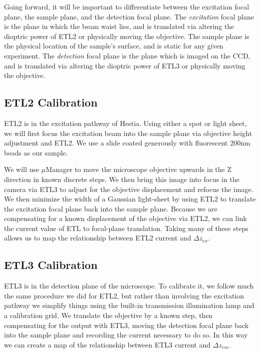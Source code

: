 Going forward, it will be important to differentiate between the excitation focal plane, the sample plane, and the detection focal plane. The \textit{excitation} focal plane is the plane in which the beam waist lies, and is translated via altering the dioptric power of ETL2 or physically moving the objective. The sample plane is the physical location of the sample's surface, and is static for any given experiment. The \textit{detection} focal plane is the plane which is imaged on the CCD, and is translated via altering the dioptric power of ETL3 or physically moving the objective.

\subsection{ETL2 Calibration}
\par ETL2 is in the excitation pathway of Hestia. Using either a spot or light sheet, we will first focus the excitation beam into the sample plane via objective height adjustment and ETL2. We use a slide coated generously with fluorescent 200nm beads as our sample.
\par We will use $\mu$Manager to move the microscope objective upwards in the Z direction in known discrete steps. We then bring this image into focus in the camera via ETL3 to adjust for the objective displacement and refocus the image. We then minimize the width of a Gaussian light-sheet by using ETL2 to translate the excitation focal plane back into the sample plane. Because we are compensating for a known displacement of the objective via ETL2, we can link the current value of ETL to focal-plane translation. Taking many of these steps allows us to map the relationship between ETL2 current and $\Delta z_{ex}$.
\subsection{ETL3 Calibration}
ETL3 is in the detection plane of the microscope. To calibrate it, we follow much the same procedure we did for ETL2, but rather than involving the excitation pathway we simplify things using the built-in transmission illumination lamp and a calibration grid. We translate the objective by a known step, then compensating for the output with ETL3, moving the detection focal plane back into the sample plane and recording the current necessary to do so. In this way we can create a map of the relationship between ETL3 current and $\Delta z_{em}$.

